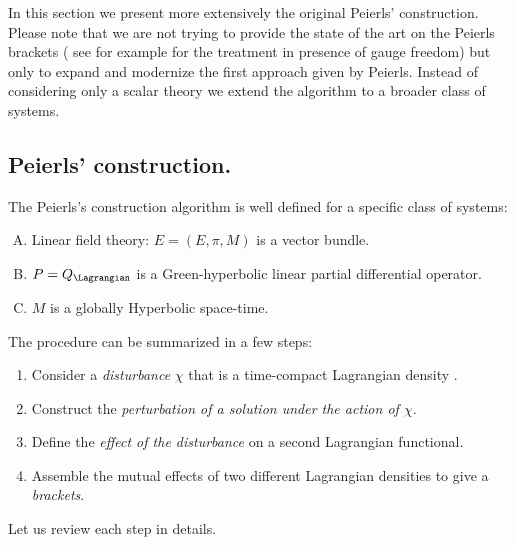 \documentclass[Main]{subfiles}
\begin{document}
		In this section we present more extensively the original Peierls' construction. 
		Please note that we are not trying to provide the state of the art on the Peierls brackets ( see for example \cite{Khavkine2014} for the treatment in presence of gauge freedom) but only to expand and modernize the first approach given by Peierls.
	Instead of considering only a scalar theory we extend the algorithm to a broader class of systems.
	
	\subsection{Peierls' construction.}
	The Peierls's construction algorithm is well defined for a specific class of systems:
		\begin{enumerate}[(A)]
			\item\label{HpPeierls1} Linear field theory: $E=(E,\pi,M)$ is a vector bundle.
			\item\label{HpPeierls2} $P=Q_\Lagrangian$ is a Green-hyperbolic linear partial differential operator.
			\item\label{HpPeierls3} $M$ is a globally Hyperbolic space-time.
		\end{enumerate}	
	The procedure can be summarized in a few steps:
	\begin{enumerate}
		\item Consider a \emph{disturbance} $\chi$ that is a time-compact Lagrangian density .
		\item Construct the \emph{perturbation of a solution under the action of $\chi$}.
		\item Define the \emph{effect of the disturbance} on a second Lagrangian functional.
		\item Assemble the mutual effects of two different Lagrangian densities to give a \emph{brackets}.
	\end{enumerate}	
	Let us review each step in details.
	
\end{document}
